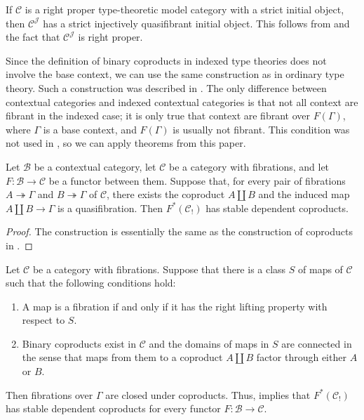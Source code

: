 \documentclass[reqno]{amsart}
\theoremstyle{definition}
\theoremstyle{remark}
\newcommand{\scat}[1]{\mathcal{#1}}
\numberwithin{figure}{section}
\begin{document}
\begin{example}
If $\scat{C}$ is a right proper type-theoretic model category with a strict initial object, then $\scat{C}^\scat{J}$ has a strict injectively quasifibrant initial object.
This follows from  and the fact that $\scat{C}^\scat{J}$ is right proper.
\end{example}

Since the definition of binary coproducts in indexed type theories does not involve the base context, we can use the same construction as in ordinary type theory.
Such a construction was described in \cite{lum-shul-hits}.
The only difference between contextual categories and indexed contextual categories is that not all context are fibrant in the indexed case;
it is only true that context are fibrant over $F(\Gamma)$, where $\Gamma$ is a base context, and $F(\Gamma)$ is usually not fibrant.
This condition was not used in \cite{lum-shul-hits}, so we can apply theorems from this paper.

\begin{prop}
Let $\scat{B}$ be a contextual category, let $\scat{C}$ be a category with fibrations, and let $F : \scat{B} \to \scat{C}$ be a functor between them.
Suppose that, for every pair of fibrations $A \twoheadrightarrow \Gamma$ and $B \twoheadrightarrow \Gamma$ of $\scat{C}$,
there exists the coproduct $A \amalg B$ and the induced map $A \amalg B \to \Gamma$ is a quasifibration.
Then $F^*(\scat{C}_!)$ has stable dependent coproducts.
\end{prop}
\begin{proof}
The construction is essentially the same as the construction of coproducts in \cite[Theorem~3.3]{lum-shul-hits}.
\end{proof}

\begin{example}
Let $\scat{C}$ be a category with fibrations.
Suppose that there is a class $S$ of maps of $\scat{C}$ such that the following conditions hold:
\begin{enumerate}
\item A map is a fibration if and only if it has the right lifting property with respect to $S$.
\item Binary coproducts exist in $\scat{C}$ and the domains of maps in $S$ are connected in the sense that maps from them to a coproduct $A \amalg B$ factor through either $A$ or $B$.
\end{enumerate}
Then fibrations over $\Gamma$ are closed under coproducts.
Thus,  implies that $F^*(\scat{C}_!)$ has stable dependent coproducts for every functor $F : \scat{B} \to \scat{C}$.
\end{example}
\end{document}
